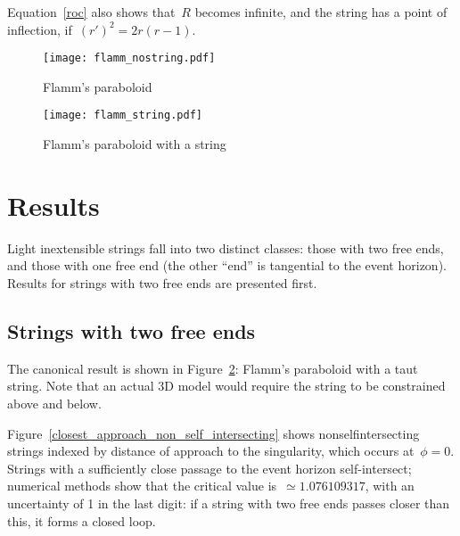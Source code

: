 \documentclass[prb,preprint]{revtex4-1}
\begin{document}
% 
% 
% 

Equation~\ref{roc} also shows that~$R$ becomes infinite, and the
string has a point of inflection,
if~$\left(r'\right)^2=2r\left(r-1\right)$.

\begin{figure}[h!]
\centering
\texttt{[image: flamm\_nostring.pdf]}
\caption{Flamm's paraboloid}
\label{flamm_nostring}
\end{figure}

\begin{figure}[h!]
\centering
\texttt{[image: flamm\_string.pdf]}
\caption{Flamm's paraboloid with a string}
\label{flamm_withstring}
\end{figure}

\section{Results}
Light inextensible strings fall into two distinct classes: those with
two free ends, and those with one free end (the other ``end'' is
tangential to the event horizon).  Results for strings with two free
ends are presented first.


\subsection{Strings with two free ends}

The canonical result is shown in Figure~\ref{flamm_withstring}:
Flamm's paraboloid with a taut string.  Note that an actual 3D model
would require the string to be constrained above and below.

Figure~\ref{closest_approach_non_self_intersecting} shows
nonselfintersecting strings indexed by distance of approach to the
singularity, which occurs at~$\phi=0$.  Strings with a sufficiently
close passage to the event horizon self-intersect; numerical methods
show that the critical value is~$\simeq 1.076109317$, with an
uncertainty of 1 in the last digit: if a string with two free ends
passes closer than this, it forms a closed loop.
\end{document}
